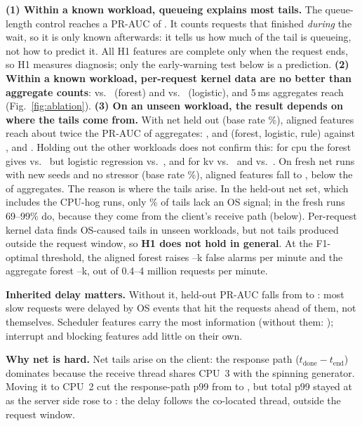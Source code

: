 \textbf{(1) Within a known workload, queueing explains most tails.} The
queue-length control reaches a PR-AUC of \apQLTest. It counts requests that
finished \emph{during} the wait, so it is only known afterwards: it tells us
how much of the tail is queueing, not how to predict it. All H1 features
are complete only when the request ends, so H1 measures diagnosis; only the
early-warning test below is a prediction. \textbf{(2) Within a known
workload, per-request kernel data are no better than aggregate counts}:
\apAlFTest{} vs.\ \apAgFTest{} (forest) and \apAlLTest{} vs.\ \apAgLTest{}
(logistic), and 5\,ms aggregates reach \ablAggFiveTest{}
(Fig.~\ref{fig:ablation}). \textbf{(3) On an unseen workload, the result
depends on where the tails come from.} With net held out (base rate
\baseHeld\%), aligned features reach about twice the PR-AUC of aggregates:
\apAlFHeld, \apAlLHeld{} and \apRuleHeld{} (forest, logistic, rule) against
\apAgFHeld, \apAgLHeld{} and \apAggRuleHeld. Holding out the other
workloads does not confirm this: for cpu the forest gives \rotCpuAlF{} vs.\
\rotCpuAgF{} but logistic regression \rotCpuAlL{} vs.\ \rotCpuAgL, and for
kv \rotKvAlF{} vs.\ \rotKvAgF{} and \rotKvAlL{} vs.\ \rotKvAgL. On
\freshRuns{} fresh net runs with new seeds and no stressor (base rate
\freshBasePct\%), aligned features fall to \freshAlL, below the \freshAgL{}
of aggregates. The reason is where the tails arise. In the held-out net
set, which includes the CPU-hog runs, only \noSigHeld\% of tails lack an OS
signal; in the fresh runs 69--99\% do, because they come from the client's
receive path (below). Per-request kernel data finds OS-caused tails in
unseen workloads, but not tails produced outside the request window, so
\textbf{H1 does not hold in general}. At the F1-optimal threshold, the
aligned forest raises \faKAlMin--\faKAlMax{}k false alarms per minute and
the aggregate forest \faKAgMin--\faKAgMax{}k, out of 0.4--4 million
requests per minute.

\textbf{Inherited delay matters.} Without it, held-out PR-AUC falls from
\ablAllHeld{} to \ablNoInhHeld: most slow requests were delayed by OS events
that hit the requests ahead of them, not themselves. Scheduler features
carry the most information (without them: \ablNoSchedHeld); interrupt and
blocking features add little on their own.



\textbf{Why net is hard.} Net tails arise on the client: the response path
($t_\mathrm{done}-t_\mathrm{end}$) dominates because the receive thread
shares CPU~3 with the spinning generator. Moving it to CPU~2 cut the
response-path p99 from \rcvGenRespP{} to \rcvOwnRespP, but total p99 stayed
at \rcvOwnP{} as the server side rose to \rcvOwnServer: the delay follows
the co-located thread, outside the request window.

